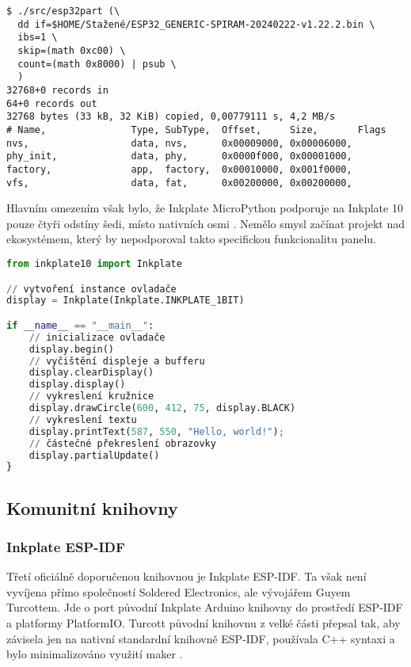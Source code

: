 \begin{lstlisting}[label=src:micropython-spiram-partition-table,caption={Tabulka oddílů vyčtena z MicroPython firmwaru pomocí nástroje esp32part}]
$ ./src/esp32part (\
  dd if=$HOME/Stažené/ESP32_GENERIC-SPIRAM-20240222-v1.22.2.bin \
  ibs=1 \
  skip=(math 0xc00) \
  count=(math 0x8000) | psub \
  )
32768+0 records in
64+0 records out
32768 bytes (33 kB, 32 KiB) copied, 0,00779111 s, 4,2 MB/s
# Name,               Type, SubType,  Offset,     Size,       Flags
nvs,                  data, nvs,      0x00009000, 0x00006000, 
phy_init,             data, phy,      0x0000f000, 0x00001000, 
factory,              app,  factory,  0x00010000, 0x001f0000, 
vfs,                  data, fat,      0x00200000, 0x00200000,
\end{lstlisting}

Hlavním omezením však bylo, že Inkplate MicroPython podporuje na Inkplate 10 pouze čtyři odstíny šedi, místo nativních osmi \cite{RenameINKPLATE_2BITINKPLATE_3BIT}. Nemělo smysl začínat projekt nad ekosystémem, který by nepodporoval takto specifickou funkcionalitu panelu.

\begin{lstlisting}[label=src:micropython-hello-world,language=Python,caption={Ukázka programu pro vykreslení kružnice a Hello World řetězce pomocí MicroPython knihovny}]
from inkplate10 import Inkplate

// vytvoření instance ovladače
display = Inkplate(Inkplate.INKPLATE_1BIT)

if __name__ == "__main__":
    // inicializace ovladače
    display.begin()
    // vyčištění displeje a bufferu
    display.clearDisplay()
    display.display()
    // vykreslení kružnice
    display.drawCircle(600, 412, 75, display.BLACK)
    // vykreslení textu
    display.printText(587, 550, "Hello, world!");
    // částečné překreslení obrazovky
    display.partialUpdate()
}
\end{lstlisting}

\subsection{Komunitní knihovny}
\subsubsection{Inkplate ESP-IDF}

Třetí oficiálně doporučenou knihovnou je Inkplate ESP-IDF. Ta však není vyvíjena přímo společností Soldered Electronics, ale vývojářem Guyem Turcottem. Jde o port původní Inkplate Arduino knihovny do prostředí ESP-IDF a platformy PlatformIO. Turcott původní knihovnu z velké části přepsal tak, aby závisela jen na nativní standardní knihovně ESP-IDF, používala C++ syntaxi a bylo minimalizováno využití maker \cite{ESPIDFInkPlateREADMEMd}.

